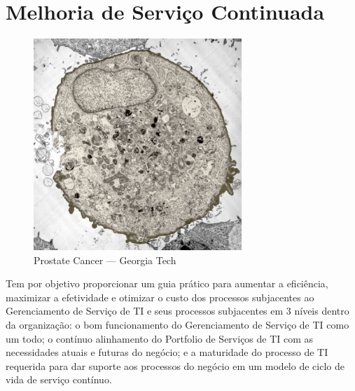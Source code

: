 %
%
%
%


\chapter{Melhoria de Serviço Continuada}
\label{cha:melhoria}


\begin{figure}
    \centering
    \includegraphics[width=0.7\textwidth]{img/prostate_cancer}\\
    {\scriptsize Prostate Cancer --- Georgia Tech}
\end{figure}

Tem por objetivo proporcionar um guia prático para aumentar a eficiência,
maximizar a efetividade e otimizar o custo dos processos subjacentes ao
Gerenciamento de Serviço de TI e seus processos subjacentes em 3 níveis dentro
da organização: o bom funcionamento do Gerenciamento de Serviço de TI como um
todo; o contínuo alinhamento do Portfolio de Serviços de TI com as necessidades
atuais e futuras do negócio; e a maturidade do processo de TI requerida para
dar suporte aos processos do negócio em um modelo de ciclo de vida de serviço
contínuo.

